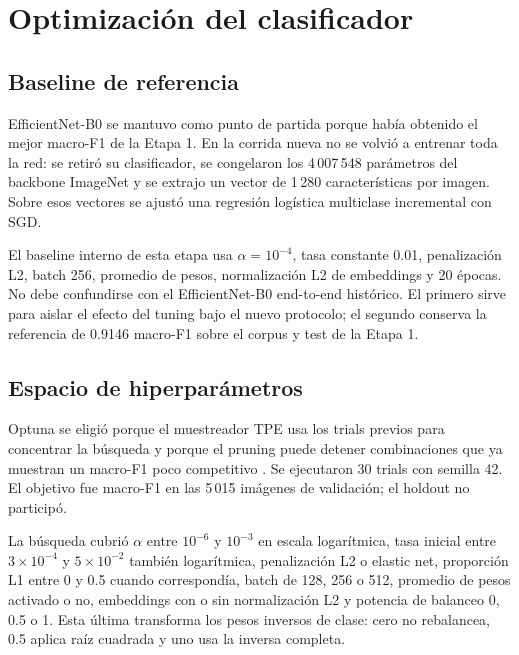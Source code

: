 \section{Optimización del clasificador}

\subsection{Baseline de referencia}

EfficientNet-B0 se mantuvo como punto de partida porque había obtenido el mejor
macro-F1 de la Etapa 1. En la corrida nueva no se volvió a entrenar toda la red:
se retiró su clasificador, se congelaron los 4\,007\,548 parámetros del
backbone ImageNet y se extrajo un vector de 1\,280 características por imagen.
Sobre esos vectores se ajustó una regresión logística multiclase incremental
con SGD.

El baseline interno de esta etapa usa $\alpha=10^{-4}$, tasa constante 0.01,
penalización L2, batch 256, promedio de pesos, normalización L2 de embeddings y
20 épocas. No debe confundirse con el EfficientNet-B0 end-to-end histórico. El
primero sirve para aislar el efecto del tuning bajo el nuevo protocolo; el
segundo conserva la referencia de 0.9146 macro-F1 sobre el corpus y test de la
Etapa 1.

\subsection{Espacio de hiperparámetros}

Optuna se eligió porque el muestreador TPE usa los trials previos para concentrar
la búsqueda y porque el pruning puede detener combinaciones que ya muestran un
macro-F1 poco competitivo \citep{akiba2019optuna}. Se ejecutaron 30 trials con
semilla 42. El objetivo fue macro-F1 en las 5\,015 imágenes de validación; el
holdout no participó.

La búsqueda cubrió $\alpha$ entre $10^{-6}$ y $10^{-3}$ en escala logarítmica,
tasa inicial entre $3\times10^{-4}$ y $5\times10^{-2}$ también logarítmica,
penalización L2 o elastic net, proporción L1 entre 0 y 0.5 cuando correspondía,
batch de 128, 256 o 512, promedio de pesos activado o no, embeddings con o sin
normalización L2 y potencia de balanceo 0, 0.5 o 1. Esta última transforma los
pesos inversos de clase: cero no rebalancea, 0.5 aplica raíz cuadrada y uno usa
la inversa completa.

\begin{table}[H]
  \centering
  \caption{Configuración del baseline interno y combinación seleccionada por
  Optuna.}
  \label{tab:tuning-config}
  \small
  
\end{table}

